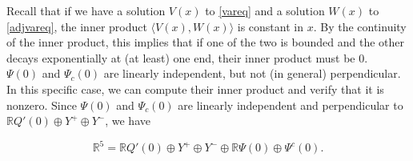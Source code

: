 \documentclass[12pt]{article}
\def\R{{\mathbb R}}
\begin{document}
Recall that if we have a solution $V(x)$ to \eqref{vareq} and a solution $W(x)$ to \eqref{adjvareq}, the inner product $\langle V(x), W(x) \rangle$ is constant in $x$. By the continuity of the inner product, this implies that if one of the two is bounded and the other decays exponentially at (at least) one end, their inner product must be 0.\\

$\Psi(0)$ and $\Psi_c(0)$ are linearly independent, but not (in general) perpendicular. In this specific case, we can compute their inner product and verify that it is nonzero. Since $\Psi(0)$ and $\Psi_c(0)$ are linearly independent and perpendicular to $\R Q'(0) \oplus Y^+ \oplus Y^-$, we have

\[
\R^5 = \R Q'(0) \oplus Y^+ \oplus Y^- \oplus \R \Psi(0) \oplus \Psi^c(0).
\]









\end{document}
